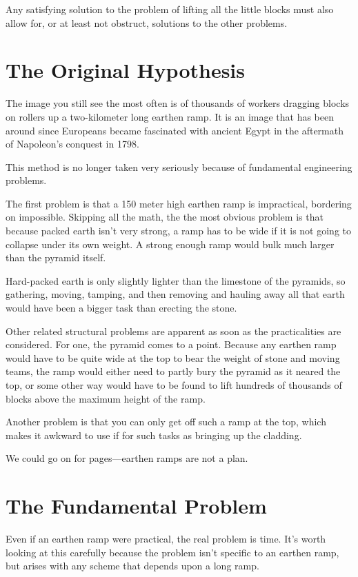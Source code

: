 \documentclass[letterpaper,11pt]{article}
\begin{document}
Any satisfying solution to the problem of lifting all the little blocks must also allow for, or at least not obstruct, solutions to the other problems.

\section{The Original Hypothesis}

The image you still see the most often is of thousands of workers dragging blocks on rollers up a two-kilometer long earthen ramp. 
It is an image that has been around since Europeans became fascinated with ancient Egypt in the aftermath of Napoleon's conquest in 1798.

This method is no longer taken very seriously because of fundamental engineering problems. 

The first problem is that a 150 meter high earthen ramp is impractical, bordering on impossible. 
Skipping all the math, the the most obvious problem is that because packed earth isn't very strong, a ramp has to be wide if it is 
not going to collapse under its own weight. 
A strong enough ramp would bulk much larger than the pyramid itself.  

Hard-packed earth is only slightly lighter than the limestone of the pyramids, so gathering, moving, tamping, and then 
removing and hauling away all that earth would have been a bigger task than erecting the stone. 

Other related structural problems are apparent as soon as the practicalities are considered. 
For one, the pyramid comes to a point. 
Because any earthen ramp would have to be quite wide at the top to bear the weight of stone and moving teams,
the ramp would either need to partly bury the pyramid as it neared the top, or some other way would have to be found to lift 
hundreds of thousands of blocks above the maximum height of the ramp.  

Another problem is that you can only get off such a ramp at the top, which makes it awkward to use if for such tasks as bringing up the cladding.

We could go on for pages---earthen ramps are not a plan.


\section{ The Fundamental Problem  }
Even if an earthen ramp were practical, the real problem is time. 
It's worth looking at this carefully because the problem isn't specific to an earthen ramp, but arises with 
any scheme that depends upon a long ramp. 
\end{document}
